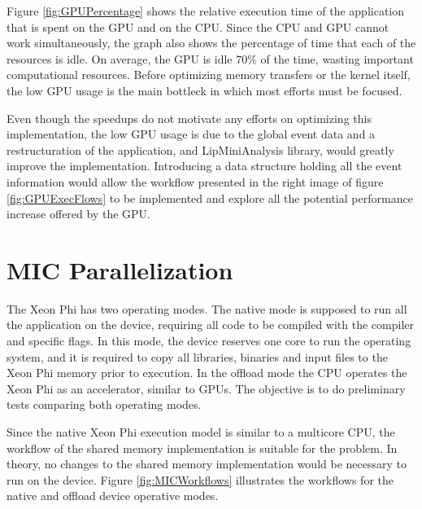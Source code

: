 Figure \ref{fig:GPUPercentage} shows the relative execution time of the application that is spent on the GPU and on the CPU. Since the CPU and GPU cannot work simultaneously, the graph also shows the percentage of time that each of the resources is idle. On average, the GPU is idle 70\% of the time, wasting important computational resources. Before optimizing memory transfers or the kernel itself, the low GPU usage is the main bottleck in which most efforts must be focused.

Even though the speedups do not motivate any efforts on optimizing this implementation, the low GPU usage is due to the global event data and a restructuration of the application, and LipMiniAnalysis library, would greatly improve the implementation. Introducing a data structure holding all the event information would allow the workflow presented in the right image of figure \ref{fig:GPUExecFlows} to be implemented and explore all the potential performance increase offered by the GPU.

\section{MIC Parallelization}
\label{Parallelization:MIC}

The \intel Xeon Phi has two operating modes. The native mode is supposed to run all the application on the device, requiring all code to be compiled with the \intel compiler and specific flags. In this mode, the device reserves one core to run the operating system, and it is required to copy all libraries, binaries and input files to the Xeon Phi memory prior to execution. In the offload mode the CPU operates the Xeon Phi as an accelerator, similar to GPUs. The objective is to do preliminary tests comparing both operating modes.

Since the native Xeon Phi execution model is similar to a multicore CPU, the workflow of the shared memory implementation is suitable for the problem. In theory, no changes to the shared memory implementation would be necessary to run on the device. Figure \ref{fig:MICWorkflows} illustrates the workflows for the native and offload device operative modes.

